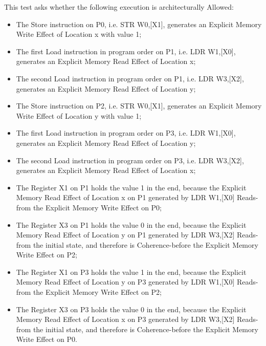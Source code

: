This test asks whether the following execution is architecturally Allowed:

\begin{itemize}
  \item The Store instruction on P0, i.e. STR W0,[X1], generates an Explicit Memory Write Effect of Location x with value 1;
  \item The first Load instruction in program order on P1, i.e. LDR W1,[X0], generates an Explicit Memory Read Effect of Location x;
  \item The second Load instruction in program order on P1, i.e. LDR W3,[X2], generates an Explicit Memory Read Effect of Location y;
  \item The Store instruction on P2, i.e. STR W0,[X1], generates an Explicit Memory Write Effect of Location y with value 1;
  \item The first Load instruction in program order on P3, i.e. LDR W1,[X0], generates an Explicit Memory Read Effect of Location y;
  \item The second Load instruction in program order on P3, i.e. LDR W3,[X2], generates an Explicit Memory Read Effect of Location x;
  \item The Register X1 on P1 holds the value 1 in the end, because the Explicit Memory Read Effect of Location x on P1 generated by LDR W1,[X0] Reads-from the Explicit Memory Write Effect on P0;
  \item The Register X3 on P1 holds the value 0 in the end, because the Explicit Memory Read Effect of Location y on P1 generated by LDR W3,[X2] Reads-from the initial state, and therefore is Coherence-before the Explicit Memory Write Effect on P2;
  \item The Register X1 on P3 holds the value 1 in the end, because the Explicit Memory Read Effect of Location y on P3 generated by LDR W1,[X0] Reads-from the Explicit Memory Write Effect on P2;
  \item The Register X3 on P3 holds the value 0 in the end, because the Explicit Memory Read Effect of Location x on P3 generated by LDR W3,[X2] Reads-from the initial state, and therefore is Coherence-before the Explicit Memory Write Effect on P0.
\end{itemize}
